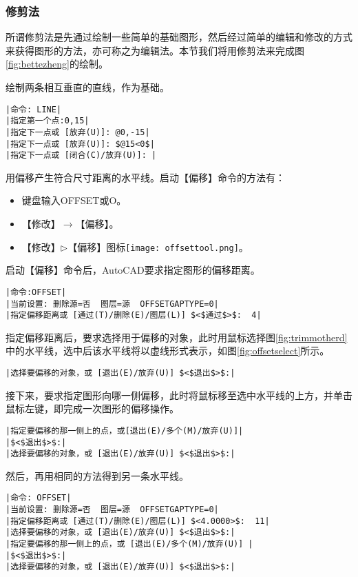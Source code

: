 \subsubsection{修剪法}
所谓修剪法是先通过绘制一些简单的基础图形，然后经过简单的编辑和修改的方式来获得图形的方法，亦可称之为编辑法。本节我们将用修剪法来完成图\ref{fig:bettezheng}的绘制。
\begin{procedure}
\item 绘制两条相互垂直的直线，作为基础。
\begin{lstlisting}
|命令: LINE|
|指定第一个点:0,15|
|指定下一点或 [放弃(U)]: @0,-15|
|指定下一点或 [放弃(U)]: $@15<0$|
|指定下一点或 [闭合(C)/放弃(U)]: |
\end{lstlisting}
\item 用偏移产生符合尺寸距离的水平线。启动【偏移】命令的方法有：
\begin{itemize}
\item 键盘输入OFFSET或O。
\item 【修改】$\rightarrow$【偏移】。
\item 【修改】$\triangleright$【偏移】图标\texttt{[image: offsettool.png]}。
\end{itemize}
启动【偏移】命令后，AutoCAD要求指定图形的偏移距离。
\begin{lstlisting}
|命令:OFFSET|
|当前设置: 删除源=否  图层=源  OFFSETGAPTYPE=0|
|指定偏移距离或 [通过(T)/删除(E)/图层(L)] $<$通过$>$:  4|
\end{lstlisting}
指定偏移距离后，要求选择用于偏移的对象，此时用鼠标选择图\ref{fig:trimmotherd}中的水平线，选中后该水平线将以虚线形式表示，如图\ref{fig:offsetselect}所示。
\begin{lstlisting}
|选择要偏移的对象，或 [退出(E)/放弃(U)] $<$退出$>$:|
\end{lstlisting}
接下来，要求指定图形向哪一侧偏移，此时将鼠标移至选中水平线的上方，并单击鼠标左键，即完成一次图形的偏移操作。
\begin{lstlisting}
|指定要偏移的那一侧上的点，或[退出(E)/多个(M)/放弃(U)]|
|$<$退出$>$:|
|选择要偏移的对象，或 [退出(E)/放弃(U)] $<$退出$>$:|
\end{lstlisting}
然后，再用相同的方法得到另一条水平线。
\begin{lstlisting}
|命令: OFFSET|
|当前设置: 删除源=否  图层=源  OFFSETGAPTYPE=0|
|指定偏移距离或 [通过(T)/删除(E)/图层(L)] $<4.0000>$:  11|
|选择要偏移的对象，或 [退出(E)/放弃(U)] $<$退出$>$:|
|指定要偏移的那一侧上的点，或 [退出(E)/多个(M)/放弃(U)] |
|$<$退出$>$:|
|选择要偏移的对象，或 [退出(E)/放弃(U)] $<$退出$>$:|
\end{lstlisting}


\end{procedure}
